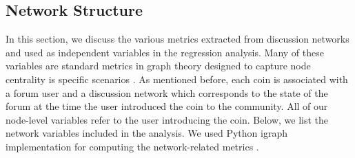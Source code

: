\subsection{Network Structure}
In this section, we discuss the various metrics extracted from discussion networks and used as independent variables in the regression analysis. Many of these variables are standard metrics in graph theory designed to capture node centrality is specific scenarios \cite{KleinbergNetworks}. As mentioned before, each coin is associated with a forum user and a discussion network which corresponds to the state of the forum at the time the user introduced the coin to the community. All of our node-level variables refer to the user introducing the coin. Below, we list the network variables included in the analysis. We used Python igraph implementation for computing the network-related metrics \cite{igraph}.
